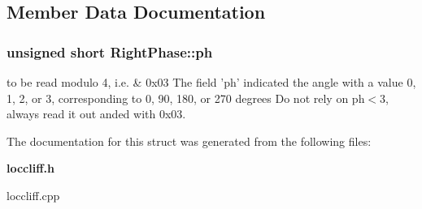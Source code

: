 \subsection{Member Data Documentation}
\subsubsection{\setlength{\rightskip}{0pt plus 5cm}unsigned short {\bf Right\-Phase::ph}}\label{structRightPhase_o0}


to be read modulo 4, i.e. \& 0x03 The field 'ph' indicated the angle with a value 0, 1, 2, or 3, corresponding to 0, 90, 180, or 270 degrees Do not rely on ph$<$3, always read it out anded with 0x03. 

The documentation for this struct was generated from the following files:\begin{CompactItemize}
\item 
{\bf loccliff.h}\item 
loccliff.cpp\end{CompactItemize}
